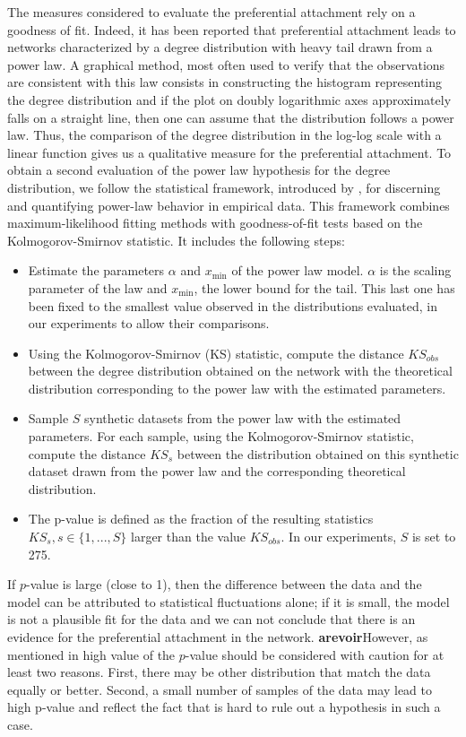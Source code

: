 \documentclass[a4paper, 12pt]{article}
\begin{document}
The measures considered to evaluate the preferential attachment rely on a goodness of fit. Indeed, it has been reported that preferential attachment leads to networks characterized by a degree distribution with heavy tail drawn from a power law. A graphical method, most often used to verify that the observations are consistent with this law  consists in constructing the histogram representing the degree distribution and if the plot on doubly logarithmic axes approximately falls on a straight line, then one can assume that the distribution follows a power law. Thus, the comparison of the degree distribution in the log-log scale with a linear function gives us a qualitative measure for the preferential attachment. To obtain a second evaluation of the power law hypothesis for the degree distribution, we follow the statistical framework, introduced by \cite{clauset2009power}, for discerning and quantifying power-law behavior in empirical data. This framework combines maximum-likelihood fitting methods with goodness-of-fit tests based on the Kolmogorov-Smirnov statistic. It includes the following steps:


\begin{itemize}
	\item Estimate the parameters $\alpha$ and $x_\text{min}$ of the power law model. $\alpha$ is the scaling parameter of the law and $x_\text{min}$, the lower bound for the tail. This last one has been fixed to the smallest value observed in the distributions evaluated, in our experiments to allow their comparisons.
	\item  Using the Kolmogorov-Smirnov (KS) statistic, compute the distance $KS_{obs}$  between the degree distribution obtained on the network with the theoretical distribution corresponding to the power law with the estimated parameters.
	\item Sample $S$ synthetic datasets from the power law with the estimated parameters. For each sample, using the Kolmogorov-Smirnov statistic, compute the distance $KS_{s}$ between the distribution obtained on this synthetic dataset drawn from the power law and the corresponding theoretical distribution. 
    \item  The p-value is defined as the fraction of  the resulting statistics $KS_s, s \in \{1,...,S\}$  larger than the value $KS_{obs}$.  In our experiments, $S$ is set to  275.
\end{itemize}

If  $p$-value is large (close to 1), then the difference between the data and the model can be attributed to statistical fluctuations alone; if it is small, the model is not a plausible fit for the data and we can not conclude that there is an evidence for the preferential attachment in the network. 
\textbf{arevoir}However, as mentioned in \cite{clauset2009power} high value of the $p$-value should be considered with caution for at least two reasons. First, there may be other distribution that match the data equally or better. Second, a small number of samples of the data may lead to high p-value and reflect the fact that is hard to rule out a hypothesis in such a case.
\end{document}
